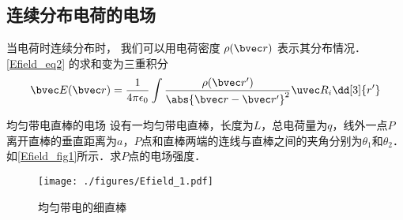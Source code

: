 \subsection{连续分布电荷的电场}
当电荷时连续分布时， 我们可以用电荷密度 $\rho(\bvec r)$ 表示其分布情况． \autoref{Efield_eq2} 的求和变为三重积分
\begin{equation}
\bvec E(\bvec r) = \frac{1}{4\pi\epsilon_0} \int \frac{\rho(\bvec r')}{\abs{\bvec r - \bvec r'}^2} \uvec R_i \dd[3]{r'}
\end{equation}

\begin{example}{均匀带电直棒的电场}\label{Efield_ex1}
设有一均匀带电直棒，长度为$L$，总电荷量为$q$，线外一点$P $离开直棒的垂直距离为$a$，$P$点和直棒两端的连线与直棒之间的夹角分别为$\theta_1$和$\theta_2$．如\autoref{Efield_fig1}所示．求$P$点的电场强度．
\begin{figure}[ht]
\centering
\texttt{[image: ./figures/Efield\_1.pdf]}
\caption{均匀带电的细直棒} \label{Efield_fig1}
\end{figure}


\end{example}
